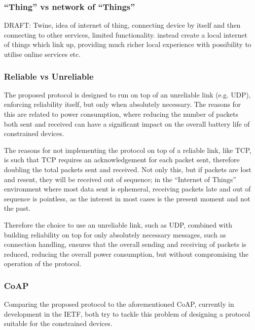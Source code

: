 \subsubsection{``Thing'' vs network of ``Things''} %
\label{ssub:_thing_vs_network_of_things_}
DRAFT: Twine, idea of internet of thing, connecting device by itself and then connecting to other services, limited functionality. instead create a local internet of things which link up, providing much richer local experience with possibility to utilise online services etc.

\subsubsection{Reliable vs Unreliable} %
\label{ssub:reliable_vs_unreliable}
The proposed protocol is designed to run on top of an unreliable link (e.g. UDP), enforcing reliability itself, but only when absolutely necessary. The reasons for this are related to power consumption, where reducing the number of packets both sent and received can have a significant impact on the overall battery life of constrained devices. 

The reasons for not implementing the protocol on top of a reliable link, like TCP, is such that TCP requires an acknowledgement for each packet sent, therefore doubling the total packets sent and received. Not only this, but if packets are lost and resent, they will be received out of sequence; in the ``Internet of Things'' environment where most data sent is ephemeral, receiving packets late and out of sequence is pointless, as the interest in most cases is the present moment and not the past. 

Therefore the choice to use an unreliable link, such as UDP, combined with building reliability on top for only absolutely necessary messages, such as connection handling, ensures that the overall sending and receiving of packets is reduced, reducing the overall power consumption, but without compromising the operation of the protocol.


\subsubsection{CoAP} %
\label{ssub:coap}
Comparing the proposed protocol to the aforementioned CoAP, currently in development in the IETF, both try to tackle this problem of designing a protocol suitable for the constrained devices.
